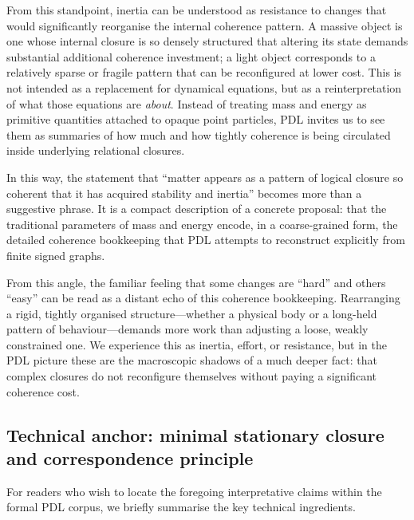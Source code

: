 \documentclass[11pt,a4paper]{article}
\theoremstyle{definition}
\begin{document}
From this standpoint, inertia can be understood as resistance to changes that would significantly reorganise the internal coherence pattern. A massive object is one whose internal closure is so densely structured that altering its state demands substantial additional coherence investment; a light object corresponds to a relatively sparse or fragile pattern that can be reconfigured at lower cost.\cite{Laubscher_Existence_PulsatingClosure_2026,Laubscher_PDL_Position_2024} This is not intended as a replacement for dynamical equations, but as a reinterpretation of what those equations are \emph{about}. Instead of treating mass and energy as primitive quantities attached to opaque point particles, PDL invites us to see them as summaries of how much and how tightly coherence is being circulated inside underlying relational closures.

In this way, the statement that ``matter appears as a pattern of logical closure so coherent that it has acquired stability and inertia'' becomes more than a suggestive phrase.\cite{Laubscher_Existence_PulsatingClosure_2026} It is a compact description of a concrete proposal: that the traditional parameters of mass and energy encode, in a coarse-grained form, the detailed coherence bookkeeping that PDL attempts to reconstruct explicitly from finite signed graphs.

From this angle, the familiar feeling that some changes are “hard” and others “easy” can be read as a distant echo of this coherence bookkeeping. Rearranging a rigid, tightly organised structure—whether a physical body or a long-held pattern of behaviour—demands more work than adjusting a loose, weakly constrained one. We experience this as inertia, effort, or resistance, but in the PDL picture these are the macroscopic shadows of a much deeper fact: that complex closures do not reconfigure themselves without paying a significant coherence cost.

\subsection{Technical anchor: minimal stationary closure and correspondence principle}

For readers who wish to locate the foregoing interpretative claims within the formal PDL corpus, we briefly summarise the key technical ingredients.\cite{Laubscher_IntroPDL_2024,Laubscher_EmergencePhysicalReality_2024,Laubscher_MinimalClosures_46_2024,Laubscher_PDL_Position_2024}
\end{document}
